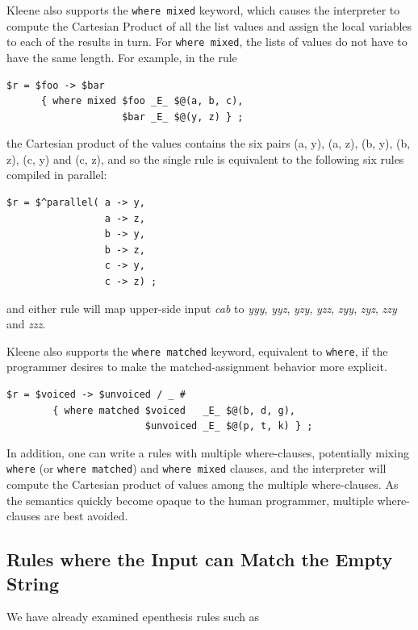 Kleene also supports the \verb!where mixed! keyword, which causes the interpreter to compute the Cartesian Product
of all the list values and assign the local variables to each of the
results in turn.  For \verb!where mixed!, the lists of values do not have
to have the same length.  For example, in the rule

\begin{Verbatim}
$r = $foo -> $bar 
      { where mixed $foo _E_ $@(a, b, c), 
	                $bar _E_ $@(y, z) } ;
\end{Verbatim}

\noindent
the Cartesian product of the values contains the six pairs (a, y), (a, z), (b, y), (b, z), (c, y) and (c, z), and so
the single rule is equivalent to the following six rules compiled in parallel:

\begin{Verbatim}
$r = $^parallel( a -> y, 
                 a -> z, 
                 b -> y, 
                 b -> z, 
                 c -> y, 
                 c -> z) ;
\end{Verbatim}

\noindent
and either rule will map upper-side input \emph{cab} to \emph{yyy}, \emph{yyz}, \emph{yzy}, \emph{yzz}, \emph{zyy}, \emph{zyz},
\emph{zzy} and \emph{zzz}.


Kleene also supports the \verb!where matched! keyword, equivalent to \verb!where!, if the
programmer desires to make the matched-assignment behavior more explicit.

\begin{Verbatim}
$r = $voiced -> $unvoiced / _ #
        { where matched $voiced   _E_ $@(b, d, g), 
                        $unvoiced _E_ $@(p, t, k) } ;
\end{Verbatim}

\noindent
In addition, one can write a rules with multiple where-clauses, potentially mixing \verb!where! (or
\verb!where matched!) and \verb!where mixed! clauses, and the interpreter will compute the Cartesian product of values
among the multiple where-clauses.  As the semantics quickly become opaque to the human programmer, multiple where-clauses are best avoided.

\subsection{Rules where the Input can Match the Empty String}

We have already examined epenthesis rules such as

